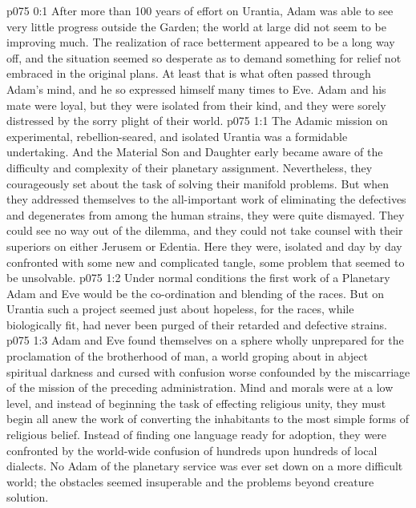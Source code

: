 \author{Solonia}
\vs p075 0:1 After more than 100 years of effort on Urantia, Adam was able to see very little progress outside the Garden; the world at large did not seem to be improving much. The realization of race betterment appeared to be a long way off, and the situation seemed so desperate as to demand something for relief not embraced in the original plans. At least that is what often passed through Adam’s mind, and he so expressed himself many times to Eve. Adam and his mate were loyal, but they were isolated from their kind, and they were sorely distressed by the sorry plight of their world.
\vs p075 1:1 The Adamic mission on experimental, rebellion\hyp{}seared, and isolated Urantia was a formidable undertaking. And the Material Son and Daughter early became aware of the difficulty and complexity of their planetary assignment. Nevertheless, they courageously set about the task of solving their manifold problems. But when they addressed themselves to the all\hyp{}important work of eliminating the defectives and degenerates from among the human strains, they were quite dismayed. They could see no way out of the dilemma, and they could not take counsel with their superiors on either Jerusem or Edentia. Here they were, isolated and day by day confronted with some new and complicated tangle, some problem that seemed to be unsolvable.
\vs p075 1:2 Under normal conditions the first work of a Planetary Adam and Eve would be the co\hyp{}ordination and blending of the races. But on Urantia such a project seemed just about hopeless, for the races, while biologically fit, had never been purged of their retarded and defective strains.
\vs p075 1:3 Adam and Eve found themselves on a sphere wholly unprepared for the proclamation of the brotherhood of man, a world groping about in abject spiritual darkness and cursed with confusion worse confounded by the miscarriage of the mission of the preceding administration. Mind and morals were at a low level, and instead of beginning the task of effecting religious unity, they must begin all anew the work of converting the inhabitants to the most simple forms of religious belief. Instead of finding one language ready for adoption, they were confronted by the world\hyp{}wide confusion of hundreds upon hundreds of local dialects. No Adam of the planetary service was ever set down on a more difficult world; the obstacles seemed insuperable and the problems beyond creature solution.
